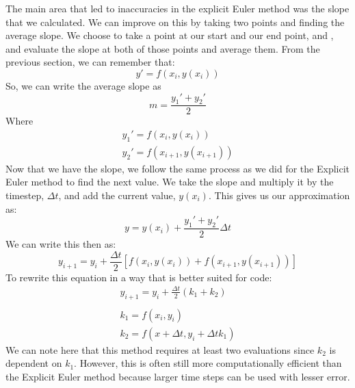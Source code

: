 \documentclass[12pt]{report}
\begin{document}
The main area that led to inaccuracies in the explicit Euler method was the slope that we calculated. We can improve on this by taking two points and finding the average slope. We choose to take a point at our start and our end point,  and , and evaluate the slope at both of those points and average them. From the previous section, we can remember that:
\begin{equation}
    y'=f\left(x_i,y(x_i)\right)
\end{equation}
So, we can write the average slope as
\begin{equation}
    m=\frac{y_1'+y_2'}{2}
\end{equation}
Where
\begin{gather}
    y_1'=f\left(x_i,y(x_i)\right)\\
    y_2'=f\left(x_{i+1},y(x_{i+1})\right)
\end{gather}
Now that we have the slope, we follow the same process as we did for the Explicit Euler method to find the next value. We take the slope and multiply it by the timestep, $\Delta t$, and add the current value, $y(x_i)$. This gives us our approximation as:
\begin{equation}
    y=y(x_i)+\frac{y_1'+y_2'}{2}\Delta t
\end{equation}
We can write this then as:
\begin{equation}
    y_{i+1}=y_i+\frac{\Delta t}{2}\left[f(x_i,y(x_i))+f(x_{i+1},y(x_{i+1}))\right]
\end{equation}
To rewrite this equation in a way that is better suited for code:
\begin{gather}\label{eq:rk2}
    y_{i+1}=y_i+\frac{\Delta t}{2}(k_1+k_2)\\\\
    k_1=f(x_i,y_i)\\
    k_2=f(x+\Delta t, y_i+\Delta tk_1)
\end{gather}
We can note here that this method requires at least two evaluations since $k_2$ is dependent on $k_1$. However, this is often still more computationally efficient than the Explicit Euler method because larger time steps can be used with lesser error.
\end{document}
